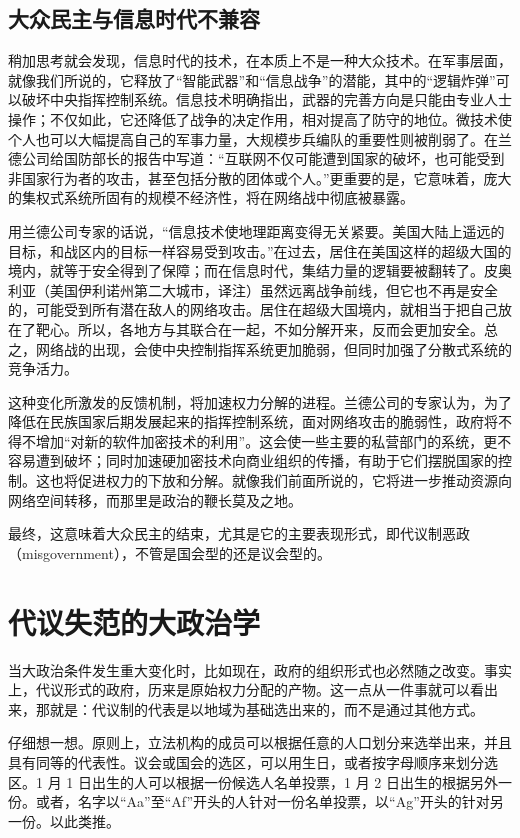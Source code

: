 \subsection{大众民主与信息时代不兼容}
稍加思考就会发现，信息时代的技术，在本质上不是一种大众技术。在军事层面，就像我们所说的，它释放了“智能武器”和“信息战争”的潜能，其中的“逻辑炸弹”可以破坏中央指挥控制系统。信息技术明确指出，武器的完善方向是只能由专业人士操作；不仅如此，它还降低了战争的决定作用，相对提高了防守的地位。微技术使个人也可以大幅提高自己的军事力量，大规模步兵编队的重要性则被削弱了。在兰德公司给国防部长的报告中写道：“互联网不仅可能遭到国家的破坏，也可能受到非国家行为者的攻击，甚至包括分散的团体或个人。”更重要的是，它意味着，庞大的集权式系统所固有的规模不经济性，将在网络战中彻底被暴露。

用兰德公司专家的话说，“信息技术使地理距离变得无关紧要。美国大陆上遥远的目标，和战区内的目标一样容易受到攻击。”在过去，居住在美国这样的超级大国的境内，就等于安全得到了保障；而在信息时代，集结力量的逻辑要被翻转了。皮奥利亚（美国伊利诺州第二大城市，译注）虽然远离战争前线，但它也不再是安全的，可能受到所有潜在敌人的网络攻击。居住在超级大国境内，就相当于把自己放在了靶心。所以，各地方与其联合在一起，不如分解开来，反而会更加安全。总之，网络战的出现，会使中央控制指挥系统更加脆弱，但同时加强了分散式系统的竞争活力。

这种变化所激发的反馈机制，将加速权力分解的进程。兰德公司的专家认为，为了降低在民族国家后期发展起来的指挥控制系统，面对网络攻击的脆弱性，政府将不得不增加“对新的软件加密技术的利用”。这会使一些主要的私营部门的系统，更不容易遭到破坏；同时加速硬加密技术向商业组织的传播，有助于它们摆脱国家的控制。这也将促进权力的下放和分解。就像我们前面所说的，它将进一步推动资源向网络空间转移，而那里是政治的鞭长莫及之地。

最终，这意味着大众民主的结束，尤其是它的主要表现形式，即代议制恶政（misgovernment），不管是国会型的还是议会型的。

\section{代议失范的大政治学}
当大政治条件发生重大变化时，比如现在，政府的组织形式也必然随之改变。事实上，代议形式的政府，历来是原始权力分配的产物。这一点从一件事就可以看出来，那就是：代议制的代表是以地域为基础选出来的，而不是通过其他方式。

仔细想一想。原则上，立法机构的成员可以根据任意的人口划分来选举出来，并且具有同等的代表性。议会或国会的选区，可以用生日，或者按字母顺序来划分选区。1 月 1 日出生的人可以根据一份候选人名单投票，1 月 2 日出生的根据另外一份。或者，名字以“Aa”至“Af”开头的人针对一份名单投票，以“Ag”开头的针对另一份。以此类推。

